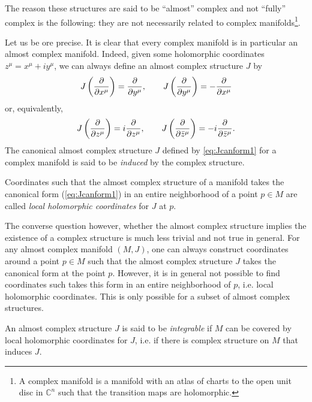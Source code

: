 \documentclass{worksheetclass}
\begin{document}
        The reason these structures are said to be ``almost'' complex and not ``fully'' complex is the following: they are not necessarily related to complex manifolds\footnote{A complex manifold is a manifold with an atlas of charts to the open unit disc in $\mathbb{C}^n$ such that the transition maps are holomorphic.}.
        
        Let us be ore precise. It is clear that every complex manifold is in particular an almost complex manifold. Indeed, given some holomorphic coordinates $z^\mu=x^\mu+iy^\mu$, we can always define an almost complex structure $J$ by
        \begin{equation}
            J\left(\pdv{}{x^\mu}\right)=\pdv{}{y^\mu},\qquad J\left(\pdv{}{y^\mu}\right)=-\pdv{}{x^\mu}\label{eq:Jcanform1}
        \end{equation}
        or, equivalently,
        \begin{equation}
            J\left(\pdv{}{z^\mu}\right)=i\pdv{}{z^\mu},\qquad J\left(\pdv{}{\bar{z}^\mu}\right)=-i\pdv{}{\bar{z}^\mu}\label{eq:Jcanform2}.
        \end{equation}
        The canonical almost complex structure $J$ defined by \eqref{eq:Jcanform1} for a complex manifold is said to be \emph{induced} by the complex structure.
        \begin{defn}
            Coordinates such that the almost complex structure of a manifold takes the canonical form (\ref{eq:Jcanform1}) in an entire neighborhood of a point $p\in M$ are called \emph{local holomorphic coordinates} for $J$ at $p$.
        \end{defn}
        
        The converse question however, whether the almost complex structure implies the existence of a complex structure is much less trivial and not true in general. For any almost complex manifold $(M,J)$, one can always construct coordinates around a point $p\in M$ such that the almost complex structure $J$ takes the canonical form at the point $p$. However, it is in general not possible to find coordinates such takes this form in an entire neighborhood of $p$, i.e. local holomorphic coordinates. This is only possible for a subset of almost complex structures.
        \begin{defn}
            An almost complex structure $J$ is said to be \emph{integrable} if $M$ can be covered by local holomorphic coordinates for $J$, i.e. if there is complex structure on $M$ that induces $J$.
        \end{defn}
\end{document}
